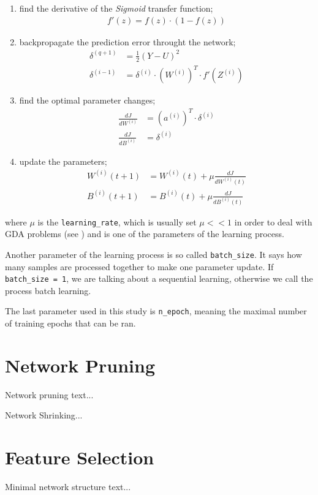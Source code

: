 \begin{enumerate}
\item find the derivative of the \textit{Sigmoid} transfer function;
\begin{align} \label{eq:transfer_function_der}
f'(z) = f(z) \cdot (1-f(z))
\end{align}
\item backpropagate the prediction error throught the network;
\begin{align} \label{eq:error_backprop}
\delta^{(q+1)} &= \frac{1}{2} (Y - U)^2 \\
\delta^{(i-1)} &= \delta^{(i)} \cdot (W^{(i)})^T \cdot f'(Z^{(i)})
\end{align}
\item find the optimal parameter changes;
\begin{align} \label{eq:part_derivative}
\frac{dJ}{dW^{(i)}} &= (a^{(i)})^T \cdot \delta^{(i)} \\
\frac{dJ}{dB^{(i)}} &= \delta^{(i)}
\end{align}
\item update the parameters;
\begin{align} \label{eq:params_update}
W^{(i)} (t+1) &= W^{(i)} (t) + \mu \frac{dJ}{dW^{(i)} (t)} \\ 
B^{(i)} (t+1) &= B^{(i)} (t) + \mu \frac{dJ}{dB^{(i)} (t)}
\end{align}
\end{enumerate}

where $ \mu $ is the \texttt{learning\_rate}, which is usually set $ \mu << 1 $ in order to deal with GDA problems (see \citep{online:nnanddl}) and is one of the parameters of the learning process.

Another parameter of the learning process is so called \texttt{batch\_size}. It says how many samples are processed together to make one parameter update. If \texttt{batch\_size = 1}, we are talking about a sequential learning, otherwise we call the process batch learning.

The last parameter used in this study is \texttt{n\_epoch}, meaning the maximal number of training epochs that can be ran.

\section{Network Pruning} \label{sec:network_pruning}
Network pruning text...

Network Shrinking...

\section{Feature Selection} \label{sec:feature_selection}
Minimal network structure text...

